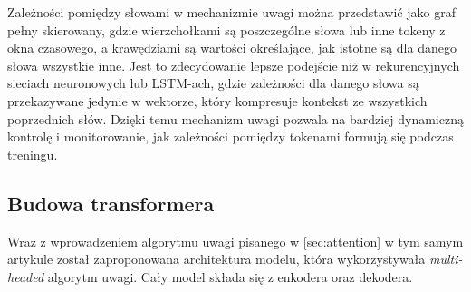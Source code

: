 \documentclass[data-science]{agh-wi} %
\begin{document}
Zależności pomiędzy słowami w mechanizmie uwagi można przedstawić jako graf pełny skierowany, gdzie wierzchołkami są poszczególne słowa lub inne tokeny z okna czasowego, a krawędziami są wartości określające, jak istotne są dla danego słowa wszystkie inne. Jest to zdecydowanie lepsze podejście niż w rekurencyjnych sieciach neuronowych lub LSTM-ach, gdzie zależności dla danego słowa są przekazywane jedynie w wektorze, który kompresuje kontekst ze wszystkich poprzednich słów. Dzięki temu mechanizm uwagi pozwala na bardziej dynamiczną kontrolę i monitorowanie, jak zależności pomiędzy tokenami formują się podczas treningu.


\subsection{Budowa transformera}
Wraz z wprowadzeniem algorytmu uwagi pisanego w \ref*{sec:attention} w tym samym artykule został zaproponowana architektura modelu, która wykorzystywała \textit{multi-headed} algorytm uwagi. Cały model składa się z enkodera oraz dekodera.
\end{document}
